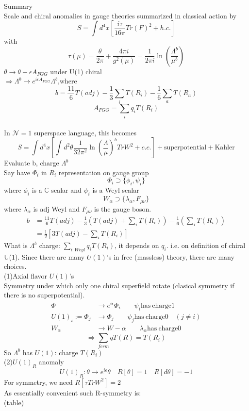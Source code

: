 \documentclass[type = bachelor]{fduthesis-en}
\begin{document}
Summary\\
Scale and chiral anomalies in gauge theories summarized in classical action by
\begin{equation}
S=\int d^4x[\frac{i\tau}{16\pi}Tr(F)^2+h.c.]
\end{equation}
with
\begin{equation}
\tau(\mu)=\frac{\theta}{2\pi}+\frac{4\pi i}{g^2(\mu)}=\frac{1}{2\pi i}\ln(\frac{\Lambda^b}{\mu^b})
\end{equation}
$\theta\rightarrow\theta+\epsilon A_{FGG}$ under U(1) chiral\\
$\Rightarrow\Lambda^b\rightarrow e^{i\epsilon A_{FGG}}\Lambda^b$,where
\begin{equation}
b=\frac{11}{6}T(adj)-\frac{1}{3}\sum_iT(R_i)-\frac{1}{6}\sum_aT(R_a)
\end{equation}
$$A_{FGG}=\sum_iq_iT(R_i)$$\\
In $\mathcal{N}=1$ superspace language, this becomes 
\begin{equation}
S=\int d^4x[\int d^2\theta\frac{1}{32\pi^2}\ln(\frac{\Lambda}{\mu})^bTrW^2+c.c.]+\mathrm{superpotential}+\mathrm{Kahler}
\end{equation}
Evaluate b, charge $\Lambda^b$\\
Say have $\Phi_i$ in $R_i$ representation on gauge group
\begin{equation}
\Phi_i\supset\{\phi_i,\psi_i\}
\end{equation}
where $\phi_i$ is a $\mathbb{C}$ scalar and $\psi_i$ is a Weyl scalar
\begin{equation}
W_\alpha\supset\{\lambda_\alpha,F_{\mu\nu}\}
\end{equation}
where $\lambda_\alpha$ is adj Weyl and $F_{\mu\nu}$ is the gauge  boson.
\begin{align}
b&=\frac{11}{6}T(adj)-\frac{1}{3}(T(adj)+\sum_iT(R_i))-\frac{1}{6}(\sum_iT(R_i))\\
&=\frac{1}{2}[3T(adj)-\sum_iT(R_i)]
\end{align}
What is $\Lambda^b$ charge: $\sum_{i:Weyl}q_iT(R_i)$, it depends on $q_i$. i.e. on definition of chiral U(1). Since there are many $U(1)$'s in free (massless) theory, there are many choices.\\
(1)Axial flavor $U(1)$'s\\
Symmetry under which only one chiral superfield rotate (clasical symmetry if there is no superpotential).
\begin{align}
\Phi&\rightarrow e^{i\epsilon}\Phi_i\qquad\psi_i \mathrm{has\ charge} 1\\
U(1)_i:=\Phi_j&\rightarrow\Phi_j\qquad\psi_j \mathrm{has\ charge} 0\quad(j\neq i)\\
W_\alpha&\rightarrow W-\alpha\qquad\lambda_\alpha \mathrm{has\ charge} 0
\end{align}
$$\Rightarrow\sum_{ferm}qT(R)=T(R_i)$$
So $\Lambda^b$ has $U(1)$: charge $T(R_i)$\\
(2)$U(1)_R$ anomaly\\
$$U(1)_R:\theta\rightarrow e^{i\epsilon}\theta \quad R[\theta]=1 \quad R[d\theta]=-1$$
For symmetry, we need $R[\tau TrW^2]=2$\\
As essentially convenient such R-symmetry is:\\
(table)

    
\end{document}
